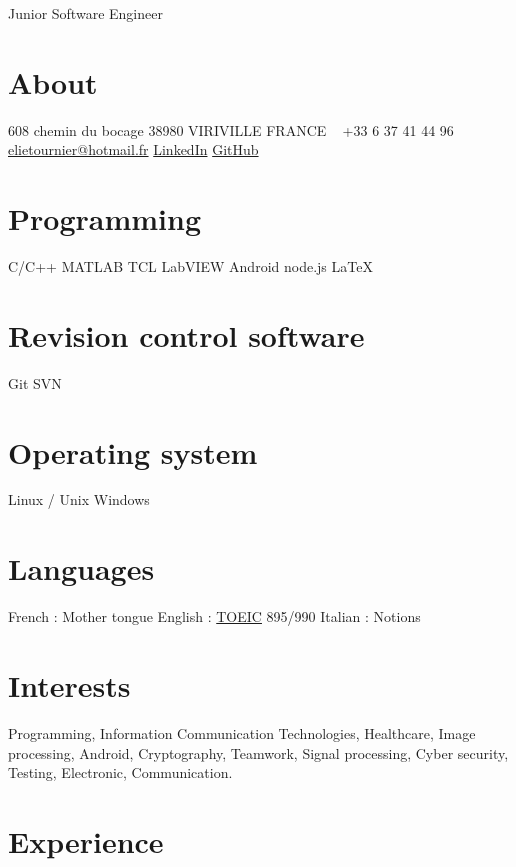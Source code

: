 \documentclass[]{Elie-cv}
\begin{document}
       {Junior Software Engineer}

\begin{aside}
  \section{About}
    608 chemin du bocage
    38980 VIRIVILLE
    FRANCE
    ~
    +33 6 37 41 44 96
    ~
    \href{mailto:elietournier@hotmail.fr}{elietournier@hotmail.fr}
    \href{https://fr.linkedin.com/in/elietournier}{LinkedIn}
    \href{https://github.com/Hopetech}{GitHub}
  \section{Programming}
   	C/C++
    MATLAB 
    TCL
    LabVIEW
    Android
    node.js
    \LaTeX{} 
  \section{Revision control software}
    Git
    SVN
  \section{Operating system}
    Linux / Unix
    Windows
  \section{Languages}
    French : Mother tongue
    English : \href{http://www.ets.org/toeic}{TOEIC} 895/990
    Italian : Notions   
\end{aside}

\section{Interests}

Programming, Information Communication Technologies, Healthcare, Image processing, Android, Cryptography, Teamwork, Signal processing, Cyber security, Testing, Electronic, Communication.   

\section{Experience}
\end{document}
